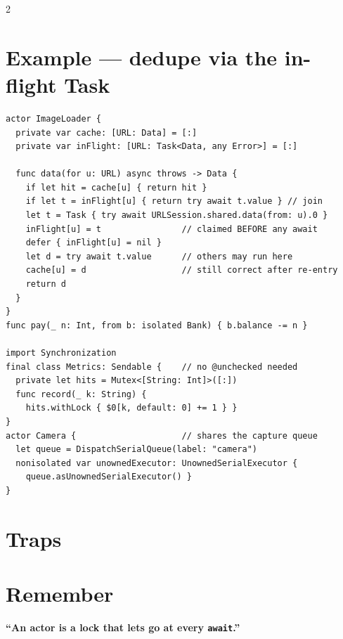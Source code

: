 \documentclass[8pt]{extarticle}
\begin{document}
\begin{multicols}{2}
\columnbreak

\section{Example — dedupe via the in-flight Task}
\begin{lstlisting}[language=SwiftSheet]
actor ImageLoader {
  private var cache: [URL: Data] = [:]
  private var inFlight: [URL: Task<Data, any Error>] = [:]

  func data(for u: URL) async throws -> Data {
    if let hit = cache[u] { return hit }
    if let t = inFlight[u] { return try await t.value } // join
    let t = Task { try await URLSession.shared.data(from: u).0 }
    inFlight[u] = t                // claimed BEFORE any await
    defer { inFlight[u] = nil }
    let d = try await t.value      // others may run here
    cache[u] = d                   // still correct after re-entry
    return d
  }
}
func pay(_ n: Int, from b: isolated Bank) { b.balance -= n }

import Synchronization
final class Metrics: Sendable {    // no @unchecked needed
  private let hits = Mutex<[String: Int]>([:])
  func record(_ k: String) {
    hits.withLock { $0[k, default: 0] += 1 } }
}
actor Camera {                     // shares the capture queue
  let queue = DispatchSerialQueue(label: "camera")
  nonisolated var unownedExecutor: UnownedSerialExecutor {
    queue.asUnownedSerialExecutor() }
}
\end{lstlisting}

\section{Traps}
\begin{itemize}
\end{itemize}

\section{Remember}
\textbf{``An actor is a lock that lets go at every \texttt{await}.''}


\end{multicols}

\end{document}
